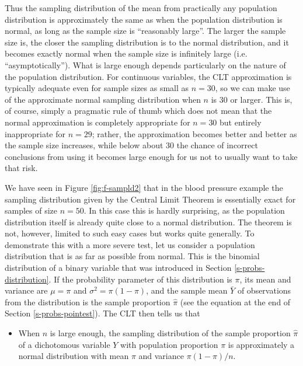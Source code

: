 \documentclass[11pt,a4paper,openany]{book}
\providecommand{\tightlist}{%
  \setlength{\itemsep}{0pt}\setlength{\parskip}{0pt}}
\begin{document}
Thus the sampling distribution of the mean from practically any
population distribution is approximately the same as when the population
distribution is normal, as long as the sample size is ``reasonably
large''. The larger the sample size is, the closer the sampling
distribution is to the normal distribution, and it becomes exactly
normal when the sample size is infinitely large (i.e.
``asymptotically''). What is large enough depends particularly on the
nature of the population distribution. For continuous variables, the CLT
approximation is typically adequate even for sample sizes as small as
\(n=30\), so we can make use of the approximate normal sampling
distribution when \(n\) is 30 or larger. This is, of course, simply a
pragmatic rule of thumb which does not mean that the normal
approximation is completely appropriate for \(n=30\) but entirely
inappropriate for \(n=29\); rather, the approximation becomes better and
better as the sample size increases, while below about 30 the chance of
incorrect conclusions from using it becomes large enough for us not to
usually want to take that risk.

We have seen in Figure \ref{fig:f-sampld2} that in the blood pressure
example the sampling distribution given by the Central Limit Theorem is
essentially exact for samples of size \(n=50\). In this case this is
hardly surprising, as the population distribution itself is already
quite close to a normal distribution. The theorem is not, however,
limited to such easy cases but works quite generally. To demonstrate
this with a more severe test, let us consider a population distribution
that is as far as possible from normal. This is the binomial
distribution of a binary variable that was introduced in Section
\ref{s-probs-distribution}. If the probability parameter of this
distribution is \(\pi\), its mean and variance are \(\mu=\pi\) and
\(\sigma^{2}=\pi(1-\pi)\), and the sample mean \(\bar{Y}\) of
observations from the distribution is the sample proportion
\(\hat{\pi}\) (see the equation at the end of Section
\ref{s-probs-pointest}). The CLT then tells us that

\begin{itemize}
\tightlist
\item
  When \(n\) is large enough, the sampling distribution of the sample
  proportion \(\hat{\pi}\) of a dichotomous variable \(Y\) with
  population proportion \(\pi\) is approximately a normal distribution
  with mean \(\pi\) and variance \(\pi(1-\pi)/n\).
\end{itemize}
\end{document}
